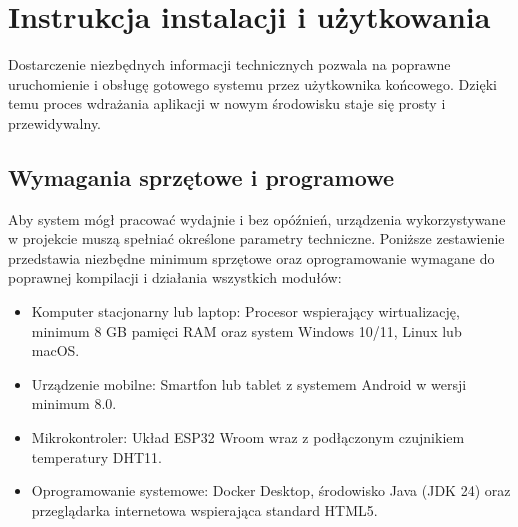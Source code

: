 \chapter{Instrukcja instalacji i użytkowania}
Dostarczenie niezbędnych informacji technicznych pozwala na poprawne uruchomienie i obsługę gotowego systemu przez użytkownika końcowego. Dzięki temu proces wdrażania aplikacji w nowym środowisku staje się prosty i przewidywalny.

\section{Wymagania sprzętowe i programowe}
Aby system mógł pracować wydajnie i bez opóźnień, urządzenia wykorzystywane \\ w projekcie muszą spełniać określone parametry techniczne. Poniższe zestawienie przedstawia niezbędne minimum sprzętowe oraz oprogramowanie wymagane do poprawnej kompilacji i działania wszystkich modułów:
\begin{itemize}
	\item Komputer stacjonarny lub laptop: Procesor wspierający wirtualizację, minimum 8 GB pamięci RAM oraz system Windows 10/11, Linux lub macOS.
	\item Urządzenie mobilne: Smartfon lub tablet z systemem Android w wersji minimum 8.0.
	\item Mikrokontroler: Układ ESP32 Wroom wraz z podłączonym czujnikiem temperatury DHT11.
	\item Oprogramowanie systemowe: Docker Desktop, środowisko Java (JDK 24) oraz przeglądarka internetowa wspierająca standard HTML5.
\end{itemize}
